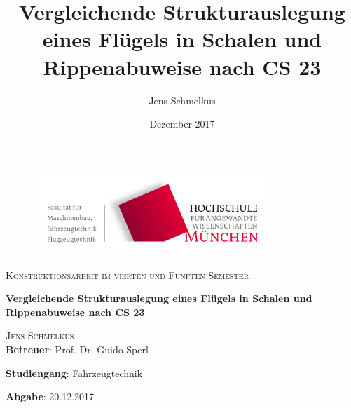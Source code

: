 \begin{titlepage}
\setcounter{page}{1}
\begin{center}
\begin{figure}[h!]
\vspace{0cm}
\centering
\includegraphics[width=0.8\textwidth]{bilder/Logos/FK03_CMYK_Block.png}
\\[0.8cm]
\end{figure}
\vspace{1.5cm}

{\fontsize{20}{60}\scshape Konstruktionsarbeit im vierten und Fünften Semester} 
\\[1.1cm]

\begin{doublespace}
{\fontsize{30}{22}\selectfont \textbf{Vergleichende Strukturauslegung eines Flügels in Schalen und Rippenabuweise nach CS 23}\par} 
\vspace{1.4cm}
\end{doublespace}

\title{Vergleichende Strukturauslegung eines Flügels in Schalen und Rippenabuweise nach CS 23}
\author{Jens Schmelkus}
\date{Dezember 2017}

{\fontsize{23}{60}\scshape Jens Schmelkus} 
\\[2.0cm]


\textbf{Betreuer}: Prof. Dr. Guido Sperl




\textbf{Studiengang}: Fahrzeugtechnik 

\textbf{Abgabe}: 20.12.2017

\vfill


\end{center}
\end{titlepage}
